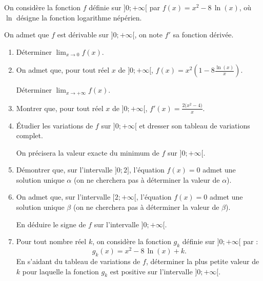 On considère la fonction $f$ définie sur $]0;+\infty[$ par $f(x)=x^2-8\,\ln(x)$, où $\ln$ désigne la fonction logarithme népérien.

\smallskip

On admet que $f$ est dérivable sur $]0;+\infty[$, on note $f'$ sa fonction dérivée.

\begin{enumerate}
	\item Déterminer $\displaystyle\lim_{x \to 0} f(x)$.
	\item On admet que, pour tout réel $x$ de $]0;+\infty[$, $f(x)=x^2 \left(1-8\frac{\ln(x)}{x}\right)$.
	
	Déterminer $\displaystyle\lim_{x \to +\infty} f(x)$.
	\item Montrer que, pour tout réel $x$ de $]0;+\infty[$, $f'(x)=\frac{2\big(x^2-4\big)}{x}$.
	\item Étudier les variations de $f$ sur $]0;+\infty[$ et dresser son tableau de variations complet.
	
	On précisera la valeur exacte du minimum de $f$ sur $]0;+\infty[$.
	\item Démontrer que, sur l'intervalle $]0;2]$, l’équation $f(x)=0$ admet une solution unique $\alpha$ (on ne cherchera pas à déterminer la valeur de $\alpha$).
	\item On admet que, sur l’intervalle $[2;+\infty[$, l’équation $f(x)=0$ admet une solution unique $\beta$ (on ne cherchera pas à déterminer la valeur de $\beta$).
	
	En déduire le signe de $f$ sur l’intervalle $]0;+\infty[$.
	\item Pour tout nombre réel $k$, on considère la fonction $g_k$ définie sur $]0;+\infty[$ par : \[ g_k(x)=x^2-8\,\ln(x)+k. \]
	En s’aidant du tableau de variations de $f$, déterminer la plus petite valeur de $k$ pour laquelle la fonction $g_k$ est positive sur l’intervalle $]0;+\infty[$.
\end{enumerate}
